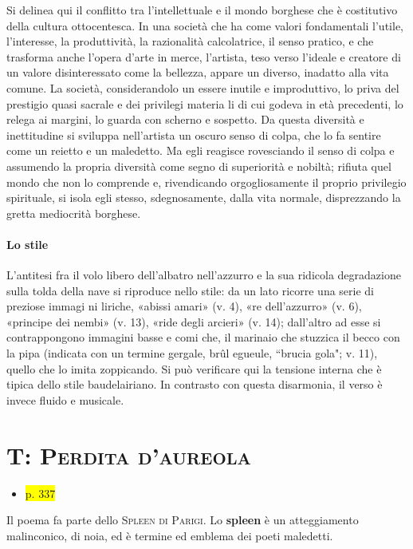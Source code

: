 \documentclass{book}
\newcommand{\pagine}[1]{\colorbox{yellow}{#1}}
\newcommand{\evidenziatore}[1]{\textbf{#1}}
\newcounter{mar}
\begin{document}
Si delinea qui il conflitto tra l'intellettuale e il mondo borghese che è costitutivo della cultura ottocentesca. In una società che ha come valori fondamentali l'utile, l'interesse, la produttività, la razionalità calcolatrice, il senso pratico, e che trasforma anche l'opera d'arte in merce, l'artista, teso verso l'ideale e creatore di un valore disinteressato come la bellezza, appare un diverso, inadatto alla vita comune. La società, considerandolo un essere inutile e improduttivo, lo priva del prestigio quasi sacrale e dei privilegi materia li di cui godeva in età precedenti, lo relega ai margini, lo guarda con scherno e sospetto. Da questa diversità e inettitudine si sviluppa nell'artista un oscuro senso di colpa, che lo fa sentire come un reietto e un maledetto. Ma egli reagisce rovesciando il senso di colpa e assumendo la propria diversità come segno di superiorità e nobiltà; rifiuta quel mondo che non lo comprende e, rivendicando orgogliosamente il proprio privilegio spirituale, si isola egli stesso, sdegnosamente, dalla vita normale, disprezzando la gretta mediocrità borghese.

\paragraph{Lo stile} L'antitesi fra il volo libero dell'albatro nell'azzurro e la sua ridicola degradazione sulla tolda della nave si riproduce nello stile: da un lato ricorre una serie di preziose immagi ni liriche, «abissi amari» (v. 4), «re dell'azzurro» (v. 6), «principe dei nembi» (v. 13), «ride degli arcieri» (v. 14); dall'altro ad esse si contrappongono immagini basse e comi che, il marinaio che stuzzica il becco con la pipa (indicata con un termine gergale, brûl egueule, “brucia gola"; v. 11), quello che lo imita zoppicando. Si può verificare qui la tensione interna che è tipica dello stile baudelairiano. In contrasto con questa disarmonia, il verso è invece fluido e musicale.

\section{T: \textsc{Perdita d'aureola}}

\begin{itemize}
\item
  \pagine{p. 337}
\end{itemize}

Il poema fa parte dello \textsc{Spleen di Parigi}. Lo
\evidenziatore{\textbf{spleen}} è un atteggiamento malinconico, di noia, ed è
termine ed emblema dei poeti maledetti.
\end{document}
